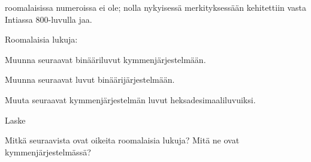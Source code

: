  roomalaisissa numeroissa ei ole; nolla nykyisessä merkityksessään kehitettiin vasta Intiassa 800-luvulla jaa.

\begin{esimerkki}
	Roomalaisia lukuja:
\end{esimerkki}

\begin{tehtavasivu}

\begin{tehtava}
Muunna seuraavat binääriluvut kymmenjärjestelmään.
\begin{vastaus}
\end{vastaus}
\end{tehtava}

\begin{tehtava}
Muunna seuraavat luvut binäärijärjestelmään.
\begin{vastaus}
\end{vastaus}
\end{tehtava}

\begin{tehtava}
Muuta seuraavat kymmenjärjestelmän luvut heksadesimaaliluvuiksi.
\end{tehtava}

\begin{tehtava}
	Laske
	\begin{vastaus}
	\end{vastaus}
\end{tehtava}

\begin{tehtava}
Mitkä seuraavista ovat oikeita roomalaisia lukuja? Mitä ne ovat kymmenjärjestelmässä?
\begin{vastaus}
\end{vastaus}
\end{tehtava}


\end{tehtavasivu}
